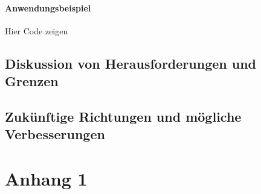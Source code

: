 \documentclass[nolibertine, ngerman, algorithm, nomencl, minted]{ttlab-qualify}
\begin{document}
\subsubsection{Anwendungsbeispiel}

Hier Code zeigen

\section{Diskussion von Herausforderungen und Grenzen}
\section{Zukünftige Richtungen und mögliche Verbesserungen}

\printbibliography
\appendix
\chapter{Anhang 1}
\end{document}
